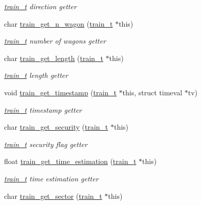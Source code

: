 \begin{DoxyCompactItemize}
\begin{DoxyCompactList}\small\item\em \hyperlink{structtrain__t}{train\-\_\-t} direction getter \end{DoxyCompactList}\item 
char \hyperlink{group__train__t__getters_gaad353579fbc68dd8d94c5ef4b189bf67}{train\-\_\-get\-\_\-n\-\_\-wagon} (\hyperlink{structtrain__t}{train\-\_\-t} $\ast$this)
\begin{DoxyCompactList}\small\item\em \hyperlink{structtrain__t}{train\-\_\-t} number of wagons getter \end{DoxyCompactList}\item 
char \hyperlink{group__train__t__getters_gad90c4e6006f54f42ee1efc4a4b920bfe}{train\-\_\-get\-\_\-length} (\hyperlink{structtrain__t}{train\-\_\-t} $\ast$this)
\begin{DoxyCompactList}\small\item\em \hyperlink{structtrain__t}{train\-\_\-t} length getter \end{DoxyCompactList}\item 
void \hyperlink{group__train__t__getters_gaab252fa1d13eabe14468e6066cb8b295}{train\-\_\-get\-\_\-timestamp} (\hyperlink{structtrain__t}{train\-\_\-t} $\ast$this, struct timeval $\ast$tv)
\begin{DoxyCompactList}\small\item\em \hyperlink{structtrain__t}{train\-\_\-t} timestamp getter \end{DoxyCompactList}\item 
char \hyperlink{group__train__t__getters_ga4fdc612ae56dddb069155d37730389a2}{train\-\_\-get\-\_\-security} (\hyperlink{structtrain__t}{train\-\_\-t} $\ast$this)
\begin{DoxyCompactList}\small\item\em \hyperlink{structtrain__t}{train\-\_\-t} security flag getter \end{DoxyCompactList}\item 
float \hyperlink{group__train__t__getters_ga9d156b0c7f88a1d52690d54780e1fd78}{train\-\_\-get\-\_\-time\-\_\-estimation} (\hyperlink{structtrain__t}{train\-\_\-t} $\ast$this)
\begin{DoxyCompactList}\small\item\em \hyperlink{structtrain__t}{train\-\_\-t} time estimation getter \end{DoxyCompactList}\item 
char \hyperlink{group__train__t__getters_ga84d9e1a50ff5f89ed6c30abc726f5334}{train\-\_\-get\-\_\-sector} (\hyperlink{structtrain__t}{train\-\_\-t} $\ast$this)

\end{DoxyCompactItemize}

